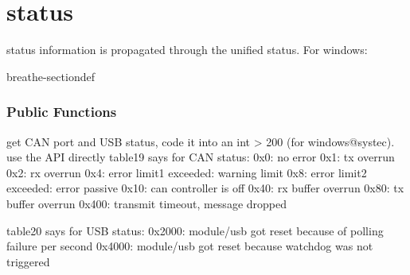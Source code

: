 \documentclass[a4paper,10pt,english]{sphinxmanual}
\begin{document}
\section{status}
\label{\detokenize{vendors/systec:status}}
\sphinxAtStartPar
status information is propagated through the unified status.
For windows:

\begin{fulllineitems}
\label{\detokenize{vendors/systec:_CPPv49STCanScan}}%
\pysigstartmultiline
{}%
\pysigstopmultiline
\begin{sphinxuseclass}{breathe-sectiondef}\subsubsection*{Public Functions}

\begin{fulllineitems}
\label{\detokenize{vendors/systec:_CPPv4N9STCanScan13getPortStatusEv}}%
\pysigstartmultiline
{}%
\pysigstopmultiline
\sphinxAtStartPar
get CAN port and USB status, code it into an int \textgreater{} 200 (for windows@systec). use the API directly table19 says for CAN status: 0x0: no error 0x1: tx overrun 0x2: rx overrun 0x4: error limit1 exceeded: warning limit 0x8: error limit2 exceeded: error passive 0x10: can controller is off 0x40: rx buffer overrun 0x80: tx buffer overrun 0x400: transmit timeout, message dropped

\sphinxAtStartPar
table20 says for USB status: 0x2000: module/usb got reset because of polling failure per second 0x4000: module/usb got reset because watchdog was not triggered 

\end{fulllineitems}


\end{sphinxuseclass}
\end{fulllineitems}
\end{document}
